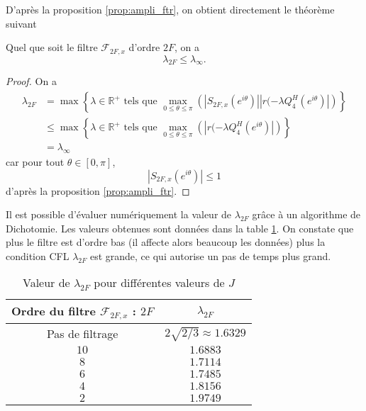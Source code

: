 D'après la proposition \ref{prop:ampli_ftr}, on obtient directement le théorème suivant
\begin{theoreme}
Quel que soit le filtre $\mathcal{F}_{2F,x}$ d'ordre $2F$, on a 
\begin{equation}
\lambda_{2F} \leq \lambda_{\infty}.
\end{equation}
\end{theoreme}

\begin{proof}
On a 
\begin{align*}
\lambda_{2F} & = \max \left\lbrace \lambda \in \mathbb{R}^+ \text{ tels que } \max_{0 \leq \theta \leq \pi} \left(|S_{2F,x}(e^{i \theta})| | r(-\lambda Q_4^H(e^{i \theta}) | \right) \right\rbrace \\
		& \leq \max \left\lbrace \lambda \in \mathbb{R}^+ \text{ tels que } \max_{0 \leq \theta \leq \pi} \left(| r(-\lambda Q_4^H(e^{i \theta}) | \right) \right\rbrace\\
		& = \lambda_{\infty}
\end{align*}
car pour tout $\theta \in [0, \pi]$, 
\begin{equation}
|S_{2F,x}(e^{i \theta})| \leq 1
\end{equation}
d'après la proposition \ref{prop:ampli_ftr}.
\end{proof}

Il est possible d'évaluer numériquement la valeur de $\lambda_{2F}$ grâce à un algorithme de Dichotomie. Les valeurs obtenues sont données dans la table \ref{tab:cfl_adv1d}. On constate que plus le filtre est d'ordre bas (il affecte alors beaucoup les données) plus la condition CFL $\lambda_{2F}$ est grande, ce qui autorise un pas de temps plus grand.

\begin{table}[htbp]
\begin{center}
\begin{tabular}{|c|c|}
\hline
\textbf{Ordre du filtre} $\mathcal{F}_{2F,x}$ : $2F$ & $\lambda_{2F}$ \\
\hline
\hline
Pas de filtrage & $2 \sqrt{2/3} \approx 1.6329$ \\
$10$ & $1.6883$ \\
$ 8$ & $1.7114$ \\
$ 6$ & $1.7485$ \\
$ 4$ & $1.8156$ \\
$ 2$ & $1.9749$ \\
\hline
\end{tabular}
\end{center}
\caption{Valeur de $\lambda_{2F}$ pour différentes valeurs de $J$}
\label{tab:cfl_adv1d}
\end{table}













